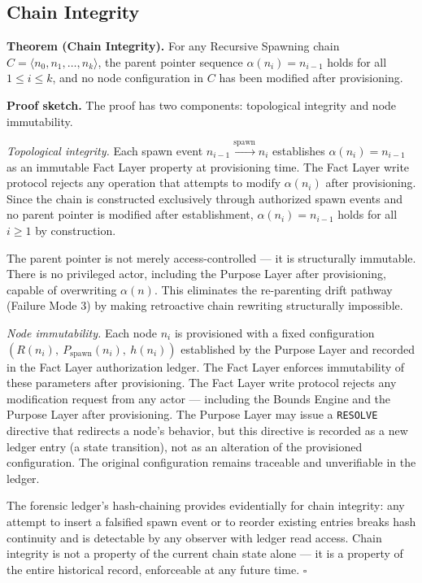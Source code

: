 \subsection{Chain Integrity}
\label{sec:rs-chain-integrity}

\noindent\textbf{Theorem (Chain Integrity).} For any Recursive Spawning chain $C = \langle n_0, n_1, \ldots, n_k \rangle$, the parent pointer sequence $\alpha(n_i) = n_{i-1}$ holds for all $1 \leq i \leq k$, and no node configuration in $C$ has been modified after provisioning.

\medskip
\noindent\textbf{Proof sketch.} The proof has two components: topological integrity and node immutability.

\medskip
\noindent\textit{Topological integrity.} Each spawn event $n_{i-1} \xrightarrow{\mathrm{spawn}} n_i$ establishes $\alpha(n_i) = n_{i-1}$ as an immutable Fact Layer property at provisioning time. The Fact Layer write protocol rejects any operation that attempts to modify $\alpha(n_i)$ after provisioning. Since the chain is constructed exclusively through authorized spawn events and no parent pointer is modified after establishment, $\alpha(n_i) = n_{i-1}$ holds for all $i \geq 1$ by construction.

The parent pointer is not merely access-controlled — it is structurally immutable. There is no privileged actor, including the Purpose Layer after provisioning, capable of overwriting $\alpha(n)$. This eliminates the re-parenting drift pathway (Failure Mode 3) by making retroactive chain rewriting structurally impossible.

\medskip
\noindent\textit{Node immutability.} Each node $n_i$ is provisioned with a fixed configuration $(R(n_i),\ P_{\mathrm{spawn}}(n_i),\ h(n_i))$ established by the Purpose Layer and recorded in the Fact Layer authorization ledger. The Fact Layer enforces immutability of these parameters after provisioning. The Fact Layer write protocol rejects any modification request from any actor — including the Bounds Engine and the Purpose Layer after provisioning. The Purpose Layer may issue a \texttt{RESOLVE} directive that redirects a node's behavior, but this directive is recorded as a new ledger entry (a state transition), not as an alteration of the provisioned configuration. The original configuration remains traceable and unverifiable in the ledger.

\medskip
The forensic ledger's hash-chaining provides evidentially for chain integrity: any attempt to insert a falsified spawn event or to reorder existing entries breaks hash continuity and is detectable by any observer with ledger read access. Chain integrity is not a property of the current chain state alone — it is a property of the entire historical record, enforceable at any future time. $\square$

